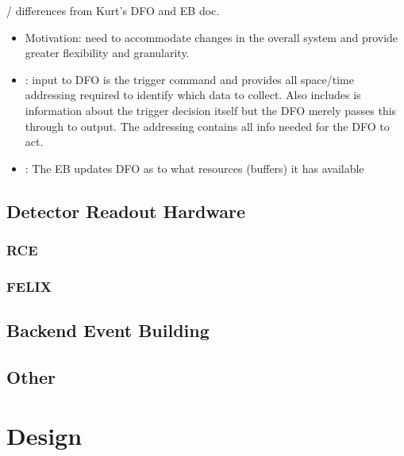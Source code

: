 / differences from Kurt's DFO and EB doc.
\begin{itemize}
\item Motivation: need to accommodate changes in the overall system and provide greater flexibility and granularity.
\item {}: input to DFO is the trigger command and provides all space/time addressing required to identify which data to collect.  Also includes is information about the trigger decision itself but the DFO merely passes this through to output.  The addressing contains all info needed for the DFO to act.
\item {}: The EB updates DFO as to what resources (buffers) it has available
\end{itemize}

\subsection{Detector Readout Hardware}


\subsubsection{RCE}

\subsubsection{FELIX}

\subsection{Backend Event Building}

\subsection{Other}

\section{ Design}
\label{sec:fd-daq:design}


